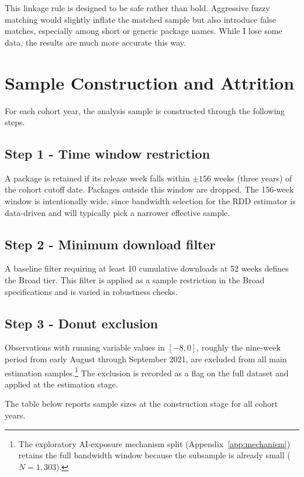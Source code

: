 \documentclass[12pt, a4paper]{report}
\begin{document}
This linkage rule is designed to be safe rather than bold. Aggressive fuzzy matching would slightly inflate the matched sample but also introduce false matches, especially among short or generic package names. While I lose some data, the results are much more accurate this way.

\section{Sample Construction and Attrition}\label{sec:data-sample}
For each cohort year, the analysis sample is constructed through the following steps.

\subsection{Step 1 - Time window restriction}\label{subsec:sample-step1}
A package is retained if its release week falls within $\pm 156$ weeks (three years) of the cohort cutoff date. Packages outside this window are dropped. The 156-week window is intentionally wide, since bandwidth selection for the RDD estimator is data-driven and will typically pick a narrower effective sample.

\subsection{Step 2 - Minimum download filter}\label{subsec:sample-step2}
A baseline filter requiring at least 10 cumulative downloads at 52 weeks defines the Broad tier. This filter is applied as a sample restriction in the Broad specifications and is varied in robustness checks.

\subsection{Step 3 - Donut exclusion}\label{subsec:sample-step3}
Observations with running variable values in $[-8, 0]$, roughly the nine-week period from early August through September 2021, are excluded from all main estimation samples.\footnote{The exploratory AI-exposure mechanism split (Appendix~\ref{app:mechanism}) retains the full bandwidth window because the subsample is already small ($N = 1{,}303$).} The exclusion is recorded as a flag on the full dataset and applied at the estimation stage.

The table below reports sample sizes at the construction stage for all cohort years.
\end{document}
